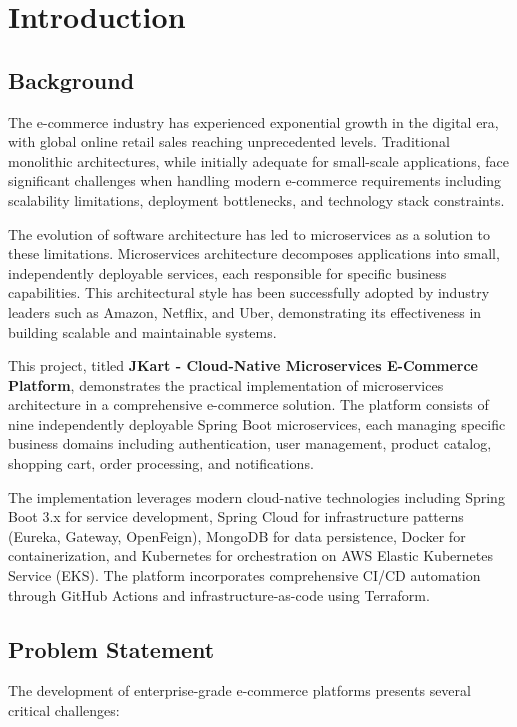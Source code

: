 \chapter{Introduction}

\section{Background}

The e-commerce industry has experienced exponential growth in the digital era, with global online retail sales reaching unprecedented levels. Traditional monolithic architectures, while initially adequate for small-scale applications, face significant challenges when handling modern e-commerce requirements including scalability limitations, deployment bottlenecks, and technology stack constraints.

The evolution of software architecture has led to microservices as a solution to these limitations. Microservices architecture decomposes applications into small, independently deployable services, each responsible for specific business capabilities. This architectural style has been successfully adopted by industry leaders such as Amazon, Netflix, and Uber, demonstrating its effectiveness in building scalable and maintainable systems.

This project, titled \textbf{JKart - Cloud-Native Microservices E-Commerce Platform}, demonstrates the practical implementation of microservices architecture in a comprehensive e-commerce solution. The platform consists of nine independently deployable Spring Boot microservices, each managing specific business domains including authentication, user management, product catalog, shopping cart, order processing, and notifications.

The implementation leverages modern cloud-native technologies including Spring Boot 3.x for service development, Spring Cloud for infrastructure patterns (Eureka, Gateway, OpenFeign), MongoDB for data persistence, Docker for containerization, and Kubernetes for orchestration on AWS Elastic Kubernetes Service (EKS). The platform incorporates comprehensive CI/CD automation through GitHub Actions and infrastructure-as-code using Terraform.

\section{Problem Statement}

The development of enterprise-grade e-commerce platforms presents several critical challenges:

